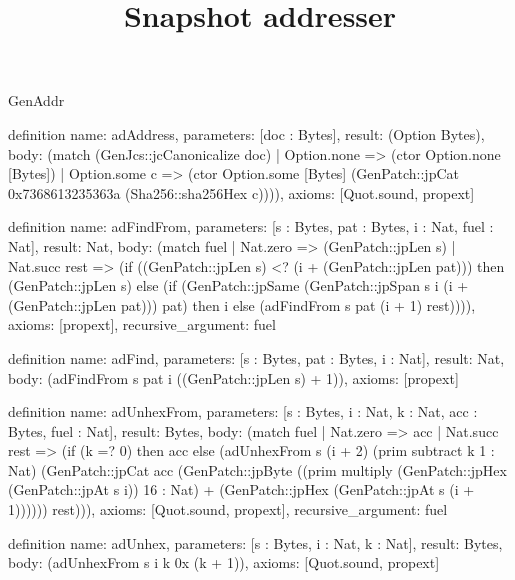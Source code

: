 \begin{lexlean}{GenAddr}
\title{Snapshot addresser}
\begin{semanticmodule}
definition{
  name: adAddress,
  parameters: [doc : Bytes],
  result: (Option Bytes),
  body: (match (GenJcs::jcCanonicalize doc)
    | Option.none => (ctor Option.none [Bytes])
    | Option.some c => (ctor Option.some [Bytes] (GenPatch::jpCat 0x7368613235363a (Sha256::sha256Hex c)))),
  axioms: [Quot.sound, propext]
}

definition{
  name: adFindFrom,
  parameters: [s : Bytes, pat : Bytes, i : Nat, fuel : Nat],
  result: Nat,
  body: (match fuel
    | Nat.zero => (GenPatch::jpLen s)
    | Nat.succ rest => (if ((GenPatch::jpLen s) <? (i + (GenPatch::jpLen pat))) then (GenPatch::jpLen s) else (if (GenPatch::jpSame (GenPatch::jpSpan s i (i + (GenPatch::jpLen pat))) pat) then i else (adFindFrom s pat (i + 1) rest)))),
  axioms: [propext],
  recursive_argument: fuel
}

definition{
  name: adFind,
  parameters: [s : Bytes, pat : Bytes, i : Nat],
  result: Nat,
  body: (adFindFrom s pat i ((GenPatch::jpLen s) + 1)),
  axioms: [propext]
}

definition{
  name: adUnhexFrom,
  parameters: [s : Bytes, i : Nat, k : Nat, acc : Bytes, fuel : Nat],
  result: Bytes,
  body: (match fuel
    | Nat.zero => acc
    | Nat.succ rest => (if (k =? 0) then acc else (adUnhexFrom s (i + 2) (prim subtract k 1 : Nat) (GenPatch::jpCat acc (GenPatch::jpByte ((prim multiply (GenPatch::jpHex (GenPatch::jpAt s i)) 16 : Nat) + (GenPatch::jpHex (GenPatch::jpAt s (i + 1)))))) rest))),
  axioms: [Quot.sound, propext],
  recursive_argument: fuel
}

definition{
  name: adUnhex,
  parameters: [s : Bytes, i : Nat, k : Nat],
  result: Bytes,
  body: (adUnhexFrom s i k 0x (k + 1)),
  axioms: [Quot.sound, propext]
}


\end{semanticmodule}
\end{lexlean}
